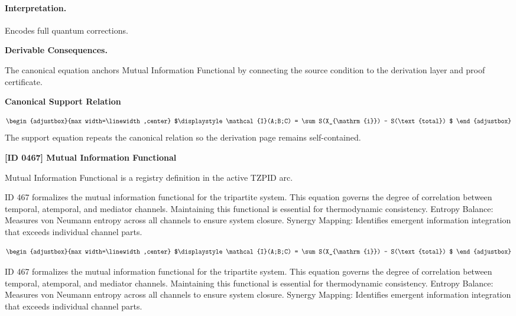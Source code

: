 \paragraph{Interpretation.}
Encodes full quantum corrections.

\par\vspace{0.35em}
\noindent\textbf{Derivable Consequences.}\quad
\begingroup
\footnotesize
\raggedright
The canonical equation anchors Mutual Information Functional by connecting the source condition to the derivation layer and proof certificate.
\par\endgroup

\noindent\textbf{Canonical Support Relation}\par
\[
\begin{adjustbox}{max width=\linewidth,center}
$\displaystyle
\mathcal{I}(A;B;C) = \sum S(X_{\mathrm{i}}) - S(\text{total})
$
\end{adjustbox}
\]
\noindent The support equation repeats the canonical relation so the derivation page remains self-contained.\par

\clearpage
\noindent\textbf{[ID 0467] Mutual Information Functional}\par
\vspace{0.35em}
\begingroup\small
{}
Mutual Information Functional is a registry definition in the active TZPID arc.

ID 467 formalizes the mutual information functional for the tripartite system. This equation governs the degree of correlation between temporal, atemporal, and mediator channels. Maintaining this functional is essential for thermodynamic consistency. Entropy Balance: Measures von Neumann entropy across all channels to ensure system closure. Synergy Mapping: Identifies emergent information integration that exceeds individual channel parts.

\[
\begin{adjustbox}{max width=\linewidth,center}
$\displaystyle
\mathcal{I}(A;B;C) = \sum S(X_{\mathrm{i}}) - S(\text{total})
$
\end{adjustbox}
\]

ID 467 formalizes the mutual information functional for the tripartite system. This equation governs the degree of correlation between temporal, atemporal, and mediator channels. Maintaining this functional is essential for thermodynamic consistency. Entropy Balance: Measures von Neumann entropy across all channels to ensure system closure. Synergy Mapping: Identifies emergent information integration that exceeds individual channel parts.

